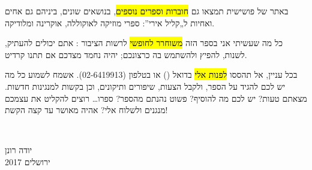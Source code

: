 באתר של פושישית תמצאו גם \hl{חוברות וספרים נוספים}, בנושאים שונים, ביניהם גם אחים ואחיות ל„קליל אירי”: ספרי מוזיקה לאוקוללה, אוקרינה ומלודיקה.

כל מה שעשיתי אני בספר הזה \hl{משוחרר לחופשי} לרשות הציבור : אתם יכולים להעתיק, לשנות, להפיץ ולהשתמש בה כרצונכם; יהיה נחמד מצדכם אם תתנו קרדיט.

בכל עניין, אל תהססו \hl{לפנות אלי} בדואל () או בטלפון (\mbox{02-6419913}). אשמח לשמוע כל מה יש לכם להגיד על הספר, ולקבל הצעות, שיפורים ותיקונים, וכן בקשות למנגינות חדשות. מצאתם טעות? יש לכם מה להוסיף? פשוט נהנתם מהספר? ספרו… רוצים להקליט את עצמכם מנגנים ולשלוח אלי? אהיה מאושר עד קצה הקשת! 

~\hfill
\begin{minipage}{3cm}
	יודה רונן\\
	ירושלים 2017\\
\end{minipage}
